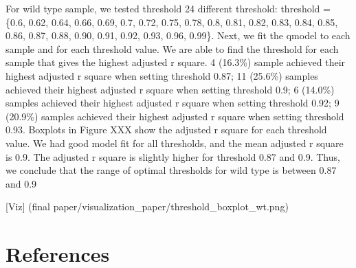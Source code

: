 \documentclass[10pt,letterpaper]{article}
\begin{document}
For wild type sample, we tested threshold 24 different threshold:
threshold = \{0.6, 0.62, 0.64, 0.66, 0.69, 0.7, 0.72, 0.75, 0.78, 0.8,
0.81, 0.82, 0.83, 0.84, 0.85, 0.86, 0.87, 0.88, 0.90, 0.91, 0.92, 0.93,
0.96, 0.99\}. Next, we fit the qmodel to each sample and for each
threshold value. We are able to find the threshold for each sample that
gives the highest adjusted r square. 4 (16.3\%) sample achieved their
highest adjusted r square when setting threshold 0.87; 11 (25.6\%)
samples achieved their highest adjusted r square when setting threshold
0.9; 6 (14.0\%) samples achieved their highest adjusted r square when
setting threshold 0.92; 9 (20.9\%) samples achieved their highest
adjusted r square when setting threshold 0.93. Boxplots in Figure XXX
show the adjusted r square for each threshold value. We had good model
fit for all thresholds, and the mean adjusted r square is 0.9. The
adjusted r square is slightly higher for threshold 0.87 and 0.9. Thus,
we conclude that the range of optimal thresholds for wild type is
between 0.87 and 0.9

{[}Viz{]} (final paper/visualization\_paper/threshold\_boxplot\_wt.png)

\hypertarget{references}{%
\section*{References}\label{references}}

\nolinenumbers
\end{document}
